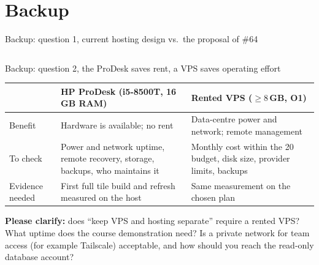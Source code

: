 \documentclass[aspectratio=169,10pt]{beamer}
\begin{document}
\backupslides
\section*{Backup}

\begin{frame}{Backup: question 1, current hosting design vs.\ the proposal of \#64}
  \begin{columns}[T,onlytextwidth]
      \par\smallskip
      \hostingcurrent
      \par\smallskip
      \hostingproposed
  \end{columns}
\end{frame}

\begin{frame}{Backup: question 2, the ProDesk saves rent, a VPS saves operating effort}
  \footnotesize
  \begin{tabular}{@{}P{26mm}P{50mm}P{50mm}@{}}
    \toprule
    & HP ProDesk (i5-8500T, 16\,GB RAM) & Rented VPS ($\ge 8$\,GB, O1) \\
    \midrule
    Benefit & Hardware is available; no rent & Data-centre power and network; remote
      management \\
    To check & Power and network uptime, remote recovery, storage, backups, who maintains it
      & Monthly cost within the 20\,\texteuro{} budget, disk size, provider limits, backups \\
    Evidence needed & First full tile build and refresh measured on the host & Same measurement on
      the chosen plan \\
    \bottomrule
  \end{tabular}
  \par\medskip
  \textbf{Please clarify:} does ``keep VPS and hosting separate'' require a rented VPS? What
  uptime does the course demonstration need? Is a private network for team access (for example
  Tailscale) acceptable, and how should you reach the read-only database account?
\end{frame}
\end{document}
